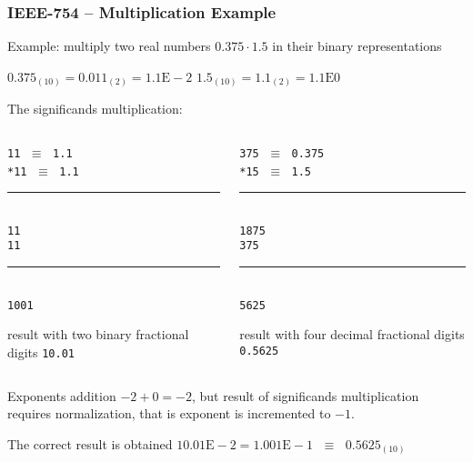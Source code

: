 \documentclass{beamer}
\begin{document}
\begin{frame}
\frametitle{IEEE-754 -- Multiplication Example}

Example: multiply two real numbers $0.375 \cdot 1.5$ in their binary representations

$0.375_{(10)} = 0.011_{(2)} = 1.1\text{E}-2$ \phantom{xxx} $1.5_{(10)} = 1.1_{(2)} = 1.1\text{E}0$

The significands multiplication:\\
\begin{columns}
\begin{column}{0.45\textwidth}
\texttt{\phantom{xxx}11} $\;\equiv\;$ \texttt{1.1}\\
\texttt{\phantom{xx}*11} $\;\equiv\;$ \texttt{1.1}\vspace{-6pt}\\
\rule[0pt]{2cm}{0.4pt}\\
\texttt{\phantom{xxx}11}\\
\texttt{\phantom{xx}11}\vspace{-6pt}\\
\rule[0pt]{2cm}{0.4pt}\\
\texttt{\phantom{x}1001} 

result with two binary fractional digits \texttt{10.01}
\end{column}
\hfill
\begin{column}{0.45\textwidth}
\texttt{\phantom{xx}375} $\;\equiv\;$ \texttt{0.375}\\
\texttt{\phantom{xx}*15} $\;\equiv\;$ \texttt{1.5}\vspace{-6pt}\\
\rule[0pt]{2cm}{0.4pt}\\
\texttt{\phantom{x}1875}\\
\texttt{\phantom{x}375}\vspace{-6pt}\\
\rule[0pt]{2cm}{0.4pt}\\
\texttt{\phantom{x}5625} 

result with four decimal fractional digits \texttt{0.5625}
\end{column}
\end{columns}
\bigskip

Exponents addition $-2+0=-2$, but result of significands multiplication requires normalization, that is exponent is incremented to $-1$.

The correct result is obtained $10.01\text{E}-2 = 1.001\text{E}-1$ $\;\equiv\;$ $0.5625_{(10)}$

\end{frame}
\end{document}

